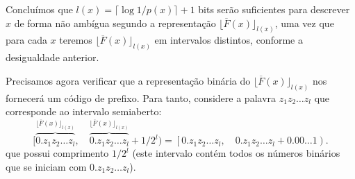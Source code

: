 Concluímos que $l(x) = \lceil \log 1/p(x) \rceil + 1$ bits serão suficientes para descrever $x$ de forma não ambígua
segundo a representação $\lfloor \overline{F}(x) \rfloor_{l(x)}$, uma vez
que para cada $x$ teremos $\lfloor \overline{F}(x) \rfloor_{l(x)}$ em intervalos distintos, conforme a desigualdade anterior.

Precisamos agora verificar que a representação binária do $\lfloor \overline{F}(x) \rfloor_{l(x)}$ nos fornecerá
um código de prefixo. Para tanto, considere a palavra $z_1 z_2 \ldots z_l$ que corresponde ao intervalo semiaberto:
\begin{equation}
  [ \overbrace{0.z_1 z_2 \ldots z_l}^{\lfloor \overline{F}(x) \rfloor_{l(x)}} , \quad \overbrace{0.z_1 z_2 \ldots z_l}^{\lfloor \overline{F}(x) \rfloor_{l(x)}} + 1/2^l  ) =
  \left[ 0.z_1 z_2 \ldots z_l , \quad 0.z_1 z_2 \ldots z_l + 0.00\ldots 1  \right) .
\end{equation}
que possui comprimento $1/2^l$ (este intervalo contém todos os números binários que se iniciam com $0.z_1 z_2 \ldots z_l$).

